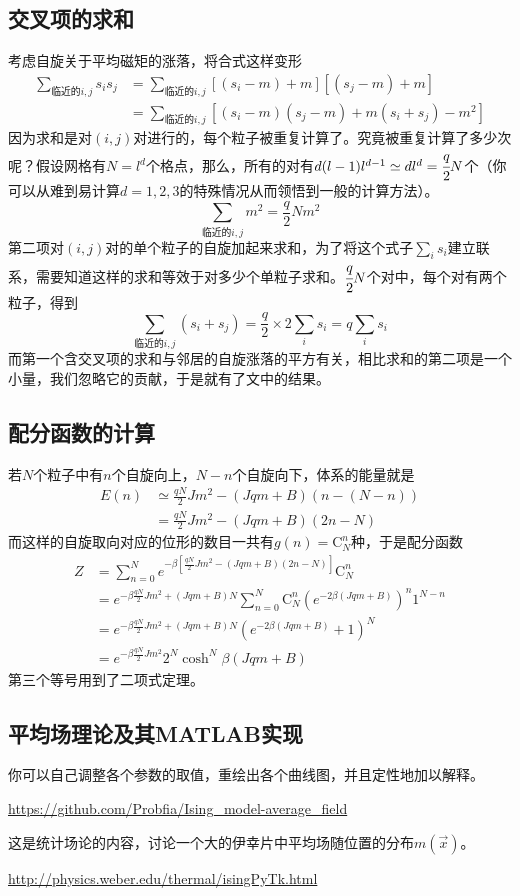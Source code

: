 \documentclass[a4paper,11pt]{ctexart}
\newcommand{\beq}{\begin{equation}}
\newcommand{\eeq}{\end{equation}}
\newcommand{\bea}{\begin{equation}\begin{aligned}}
\newcommand{\eea}{\end{aligned}\end{equation}}
\begin{document}
\subsection{交叉项的求和}
考虑自旋关于平均磁矩的涨落，将合式这样变形
\bea
\sum_{\text{临近的}i,j} s_i s_j &= \sum_{\text{临近的}i,j} [(s_i-m)+m][ (s_j-m)+m]\\
&= \sum_{\text{临近的}i,j}[(s_i-m)(s_j-m) +m(s_i+s_j) - m^2]
\eea
因为求和是对$(i,j)$对进行的，每个粒子被重复计算了。究竟被重复计算了多少次呢？假设网格有$N=l^d$个格点，那么，所有的对有$d(l-1)l^{d-1} \simeq dl^d=\cfrac{q}{2}N$个（你可以从难到易计算$d=1,2,3$的特殊情况从而领悟到一般的计算方法）。
\beq
\sum_{\text{临近的}i,j}m^2 =\frac{q}{2}Nm^2
\eeq
第二项对$(i,j)$对的单个粒子的自旋加起来求和，为了将这个式子$\sum_i s_i$建立联系，需要知道这样的求和等效于对多少个单粒子求和。$\cfrac{q}{2}N$个对中，每个对有两个粒子，得到
\beq
\sum_{\text{临近的}i,j} (s_i+s_j)= \frac{q}{2} \times 2 \sum_i s_i = q\sum_i s_i
\eeq
而第一个含交叉项的求和与邻居的自旋涨落的平方有关，相比求和的第二项是一个小量，我们忽略它的贡献，于是就有了文中的结果。
\subsection{配分函数的计算}
若$N$个粒子中有$n$个自旋向上，$N-n$个自旋向下，体系的能量就是
\bea
E(n) &\simeq \frac{qN}{2}Jm^2 - (Jqm+B)(n-(N-n))\\
&= \frac{qN}{2}Jm^2 - (Jqm+B)(2n-N)
\eea
而这样的自旋取向对应的位形的数目一共有$g(n) = \mathrm{C}_N^n$种，于是配分函数
\bea
Z &= \sum_{n=0}^N e^{-\beta[\frac{qN}{2}Jm^2 - (Jqm+B)(2n-N)]}\mathrm{C}_N^n\\
&= e^{-\beta \frac{qN}{2}Jm^2+(Jqm+B)N}\sum_{n=0}^N \mathrm{C}_N^n (e^{-2\beta(Jqm+B)})^n 1^{N-n} \\
&= e^{-\beta \frac{qN}{2}Jm^2+(Jqm+B)N}(e^{-2\beta(Jqm+B)}+1)^N\\
&= e^{-\beta \frac{qN}{2}Jm^2}2^N\cosh^N\beta(Jqm+B)
\eea
第三个等号用到了二项式定理。
\subsection{平均场理论及其MATLAB实现}
你可以自己调整各个参数的取值，重绘出各个曲线图，并且定性地加以解释。
\par
\url{https://github.com/Probfia/Ising_model-average_field}
\par
这是统计场论的内容，讨论一个大的伊幸片中平均场随位置的分布$m(\vec{x})$。\par
\url{http://physics.weber.edu/thermal/isingPyTk.html}
\end{document}
